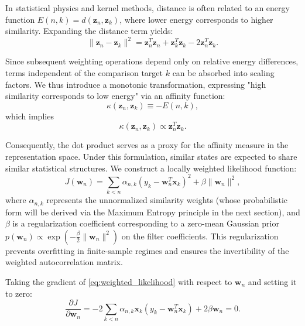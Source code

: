 \documentclass[conference]{IEEEtran}
\begin{document}
In statistical physics and kernel methods, distance is often related to an energy function $E(n,k) = d(\mathbf{z}_n, \mathbf{z}_k)$, where lower energy corresponds to higher similarity. Expanding the distance term yields:
\begin{equation}
\|\mathbf{z}_n - \mathbf{z}_k\|^2 = \mathbf{z}_n^T \mathbf{z}_n + \mathbf{z}_k^T \mathbf{z}_k - 2\mathbf{z}_n^T \mathbf{z}_k.
\end{equation}

Since subsequent weighting operations depend only on relative energy differences, terms independent of the comparison target $k$ can be absorbed into scaling factors. We thus introduce a monotonic transformation, expressing "high similarity corresponds to low energy" via an affinity function:
\begin{equation}
\kappa(\mathbf{z}_n, \mathbf{z}_k) \equiv -E(n,k),
\end{equation}
which implies
\begin{equation}
\kappa(\mathbf{z}_n, \mathbf{z}_k) \propto \mathbf{z}_n^T \mathbf{z}_k.
\end{equation}

Consequently, the dot product serves as a proxy for the affinity measure in the representation space. Under this formulation, similar states are expected to share similar statistical structures. We construct a locally weighted likelihood function:
\begin{equation}
J(\mathbf{w}_n) = \sum_{k<n} \alpha_{n,k} (y_k - \mathbf{w}_n^T \mathbf{x}_k)^2 + \beta \|\mathbf{w}_n\|^2,
\label{eq:weighted_likelihood}
\end{equation}
where $\alpha_{n,k}$ represents the unnormalized similarity weights (whose probabilistic form will be derived via the Maximum Entropy principle in the next section), and $\beta$ is a regularization coefficient corresponding to a zero-mean Gaussian prior $p(\mathbf{w}_n) \propto \exp(-\frac{\beta}{2}\|\mathbf{w}_n\|^2)$ on the filter coefficients. This regularization prevents overfitting in finite-sample regimes and ensures the invertibility of the weighted autocorrelation matrix.

Taking the gradient of \eqref{eq:weighted_likelihood} with respect to $\mathbf{w}_n$ and setting it to zero:
\begin{equation}
\frac{\partial J}{\partial \mathbf{w}_n} = -2\sum_{k<n} \alpha_{n,k} \mathbf{x}_k (y_k - \mathbf{w}_n^T \mathbf{x}_k) + 2\beta \mathbf{w}_n = 0.
\end{equation}
\end{document}
